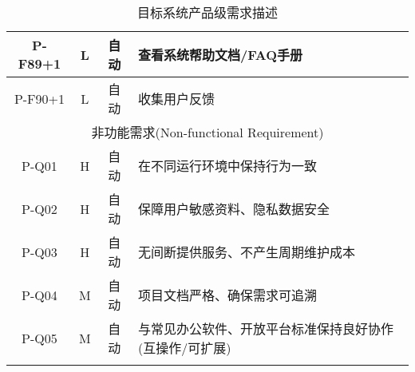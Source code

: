 \begin{longtable}{|c|c|c|X|}
  P-F89+1 & L & 自动 & 查看系统帮助文档/FAQ手册 \\ \hline
  P-F90+1 & L & 自动 & 收集用户反馈 \\ \hline
  \multicolumn{4}{|c|}{非功能需求(Non-functional Requirement)} \\ \hline
  P-Q01   & H & 自动 & 在不同运行环境中保持行为一致 \\ \hline
  P-Q02   & H & 自动 & 保障用户敏感资料、隐私数据安全 \\ \hline
  P-Q03   & H & 自动 & 无间断提供服务、不产生周期维护成本 \\ \hline
  P-Q04   & M & 自动 & 项目文档严格、确保需求可追溯 \\ \hline
  P-Q05   & M & 自动 & 与常见办公软件、开放平台标准保持良好协作(互操作/可扩展) \\ \hline

  \caption{目标系统产品级需求描述}

\end{longtable}

